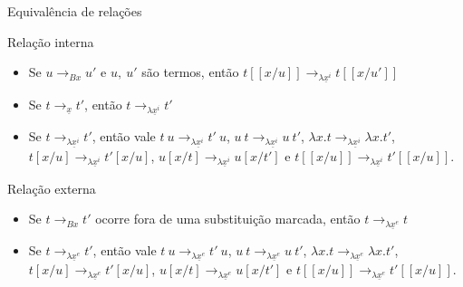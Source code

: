 \documentclass{beamer}
\begin{document}
\begin{frame}{Equivalência de relações}

    \begin{block}{Relação interna}
    \begin{itemize}
        \item Se $u \rightarrow_{Bx} u'$ e $u,\ u'$ são termos, então $t[\![x/u]\!]
            \rightarrow_{\lambda \underline{x}^i} t[\![x/u']\!]$ 
        \item Se $t
            \rightarrow_{\underline{x}} t'$, então $t \rightarrow_{\lambda
                \underline{x}^i} t'$
        \item Se $t \rightarrow_{\lambda \underline{x}^i} t'$, então vale 
            $t\ u \rightarrow_{\lambda \underline{x}^i} t'\ u$,  
            $u\ t \rightarrow_{\lambda \underline{x}^i} u\ t'$, 
            $\lambda x. t \rightarrow_{\lambda \underline{x}^i} \lambda x. t'$, 
            $t[x/u] \rightarrow_{\lambda \underline{x}^i} t'[x/u]$, 
            $u[x/t] \rightarrow_{\lambda \underline{x}^i} u[x/t']$ e 
            $t[\![x/u]\!] \rightarrow_{\lambda \underline{x}^i} t'[\![x/u]\!]$.
    \end{itemize}
    \end{block}

    \begin{block}{Relação externa}
    \begin{itemize}
        \item Se $t \rightarrow_{Bx} t'$ ocorre fora de uma substituição marcada, então 
            $t \rightarrow_{\lambda \underline{x}^e} t$ 
        \item Se $t \rightarrow_{\lambda \underline{x}^e} t'$, então vale 
            $t\ u \rightarrow_{\lambda \underline{x}^e} t'\ u$,  
            $u\ t \rightarrow_{\lambda \underline{x}^e} u\ t'$, 
            $\lambda x. t \rightarrow_{\lambda \underline{x}^e} \lambda x. t'$, 
            $t[x/u] \rightarrow_{\lambda \underline{x}^e} t'[x/u]$, 
            $u[x/t] \rightarrow_{\lambda \underline{x}^e} u[x/t']$ e 
            $t[\![x/u]\!] \rightarrow_{\lambda \underline{x}^e} t'[\![x/u]\!]$.
    \end{itemize}
    \end{block}
    
\end{frame}

\end{document}
